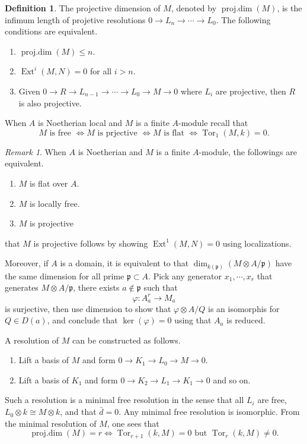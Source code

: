 \documentclass[leqno]{amsart}
\DeclareMathOperator{\prd}{proj.dim}
\newcommand{\1}{\mathbf{1}}
\newcommand{\fp}{\mathfrak p}
\DeclareMathOperator{\Ext}{Ext}
\DeclareMathOperator{\Tor}{Tor}
\theoremstyle{definition}
\newtheorem{defn}[thm]{Definition}
\theoremstyle{remark}
\newtheorem{rem}[thm]{Remark}
\begin{document}
\begin{defn}
	The projective dimension of $M$,
	denoted by $\prd(M)$, is the 
	infimum length of projetive resolutions 
	$0\to L_{n}\to \cdots\to L_0$.
	The following conditions are equivalent.
	\begin{enumerate}[label=(\alph*)]
		\item $\prd(M)\leq n$.
		\item  $\Ext^i(M,N)=0$ for all $i>n$.
		\item Given  $0\to R\to L_{n-1}\to \cdots\to L_0
			\to M\to 0$ where $L_i$ are projective,
			then  $R$ is also projective.
	\end{enumerate}
\end{defn}
When $A$ is Noetherian local and  $M$ is a finite  $A$-module
recall that 
\[
	M  \text{ is free } \Longleftrightarrow
	M  \text{ is prjective } \Longleftrightarrow
	M  \text{ is flat } \Longleftrightarrow
	\Tor_1(M,k)=0.
\]
\begin{rem}
	When $A$ is Noetherian
	and  $M$ is a finite $A$-module,
	the followings are equivalent.
	 \begin{enumerate}[label=(\alph*)]
		\item $M$ is flat over $A$.
		\item  $M$ is locally free.
		\item  $M$ is projective
	\end{enumerate}
	that $M$ is projective follows
	by showing $\Ext^1(M,N)=0$
	using localizations.

	Moreover, if  $A$ is a domain,
	it is equivalent to that 
	$\dim_{k(\fp)}(M\otimes A/\fp)$
	have the same dimension for all
	prime $\fp\subset A$.
	Pick any generator $x_1,\cdots,x_r$
	that generates $M\otimes A/\fp$,
	there exists  $a\notin \fp$
	such that
	 \[
		\varphi\colon A_a^r\to M_a
	\]
	is surjective,
	then use dimension to show that
	$\varphi\otimes A/Q$ is an isomorphis
	for $Q\in D(a)$,
	and conclude that  $\ker(\varphi)=0$
	using that  $A_a$ is reduced.
\end{rem}
A resolution of $M$ can be constructed as follows.
\begin{enumerate}
	\item Lift a basis of $M$ and form
		 $0\to K_1\to L_0\to M\to 0$.
	\item Lift a basis of  $K_1$ and form
		  $0\to K_2\to L_1\to K_1\to 0$ and so on.
\end{enumerate}
Such a resolution is a minimal free resolution in the sense that
all $L_i$ are free,  $L_0\otimes k\cong M\otimes k$,
and that  $\bar{d}=0$.
Any minimal free resolution is isomorphic.
From the minimal resolution of $M$, one sees that 
\[
	\prd(M)=r \Longleftrightarrow
	\Tor_{r+1}(k,M)=0 \text{ but }
	\Tor_{r}(k,M)\neq0.
\]
\end{document}
